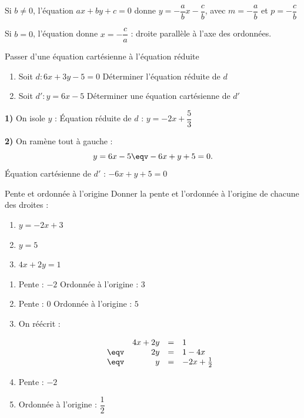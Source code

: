 \newpage
\begin{demo}{}
	\bi
	\item Si $b \neq 0$, l'équation $ax + by + c = 0$ donne
	$y = -\dfrac{a}{b}x - \dfrac{c}{b}$, avec $m = -\dfrac{a}{b}$ et
	$p = -\dfrac{c}{b}$
	\item Si $b = 0$, l'équation donne $x = -\dfrac{c}{a}$ : droite parallèle
	à l'axe des ordonnées.
	\ei
\end{demo}

\begin{methode}{Passer d'une équation cartésienne à l'équation réduite}
	\begin{enumerate}
		\item Soit $d : 6x + 3y - 5 = 0$ Déterminer l'équation réduite de $d$
		\item Soit $d' : y = 6x - 5$ Déterminer une équation cartésienne de $d'$
	\end{enumerate}

	\begin{correction}

		\textbf{1)} On isole $y$ :
		Équation réduite de $d$ : $y = -2x + \dfrac{5}{3}$

		\ms

		\textbf{2)} On ramène tout à gauche :
		\[
			y = 6x - 5 \eqv -6x + y + 5 = 0.
		\]
		Équation cartésienne de $d'$ : $-6x + y + 5 = 0$
	\end{correction}
\end{methode}

\begin{exercice}{Pente et ordonnée à l'origine}
	Donner la pente et l'ordonnée à l'origine de chacune des droites :
	\begin{enumerate}
		\item $y = -2x + 3$
		\item $y = 5$
		\item $4x + 2y = 1$
	\end{enumerate}

	\begin{correction}
		\begin{enumerate}
			\item Pente : $-2$ \quad Ordonnée à l'origine : $3$
			\item Pente : $0$ \quad Ordonnée à l'origine : $5$
			\item On réécrit :

			      $$\begin{array}{rrcl}
					           & 4x + 2y & = & 1                  \\
					      \eqv & 2y      & = & 1-4x               \\
					      \eqv & y       & = & -2x + \tfrac{1}{2}
				      \end{array}$$

			      \bi\item Pente : $-2$\item Ordonnée à l'origine : $\dfrac{1}{2}$\ei
		\end{enumerate}
	\end{correction}
\end{exercice}

